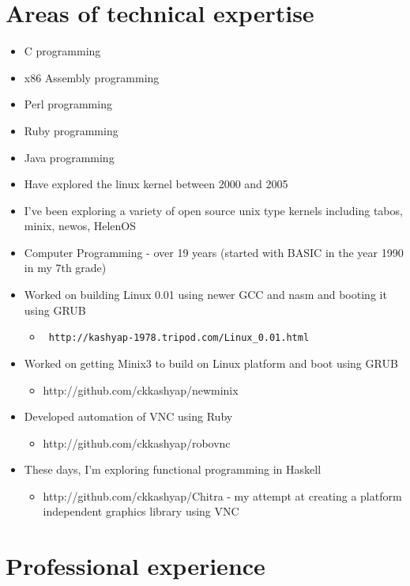 \documentclass [a4paper,11pt] {article}
\begin{document}
\section*{Areas of technical expertise}
\begin{itemize}
	\item C programming
	\item x86 Assembly programming
	\item Perl programming
	\item Ruby programming
	\item Java programming
	\item Have explored the linux kernel between 2000 and 2005
	\item I’ve been exploring a variety of open source unix type kernels including tabos, minix, newos, HelenOS
	\item Computer Programming - over 19 years (started with BASIC in the year 1990 in my 7th grade)
	\item Worked on building Linux 0.01 using newer GCC and nasm and booting it using GRUB
		\begin{itemize}
			\item \begin{verbatim} http://kashyap-1978.tripod.com/Linux_0.01.html \end{verbatim}
		\end{itemize}
	\item Worked on getting Minix3 to build on Linux platform and boot using GRUB
		\begin{itemize}
			\item http://github.com/ckkashyap/newminix
		\end{itemize}
	\item Developed automation of VNC using Ruby
		\begin{itemize}
			\item http://github.com/ckkashyap/robovnc
		\end{itemize}
	\item These days, I'm exploring functional programming in Haskell
		\begin{itemize}
			\item http://github.com/ckkashyap/Chitra - my attempt at creating a platform independent graphics library using VNC
		\end{itemize}
\end{itemize}


\section*{Professional experience}
\end{document}
